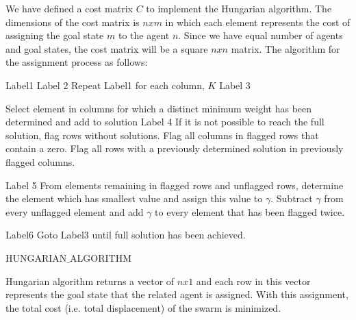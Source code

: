 We have defined a cost matrix  $C$ to implement the Hungarian algorithm. The dimensions of the cost matrix is $nxm$ in which each element represents the cost of assigning the goal state $m$ to the agent $n$.  Since we have equal number of agents and goal states, the cost matrix will be a square $nxn$ matrix.  The algorithm for the assignment process as follows:
	
\begin{algorithm}[H]
Label1  \;
Label 2  \; 
{Repeat Label1 for each column, $K$}
Label 3  \; 

Select element in columns for which a distinct minimum weight has been determined and add to solution \newline
Label 4 \;
If it is not possible to reach the full solution, flag rows without solutions. Flag all columns in flagged rows that contain a zero. Flag all rows with a previously determined solution in previously flagged columns.
     
Label 5 \;
From elements remaining in flagged rows and unflagged rows, determine the element which has smallest value and assign this value to $\gamma$. Subtract $\gamma$  from every unflagged element and add  $\gamma$ to every element that has been flagged twice.
     
Label6 \;
Goto Label3 until full solution has been achieved. \newline    
\caption{HUNGARIAN$\_$ALGORITHM}
\end{algorithm}

Hungarian algorithm returns a vector of $nx1$ and each row in this vector represents the goal state that the related agent is assigned. With this assignment, the total cost (i.e. total displacement) of the swarm is minimized. 
